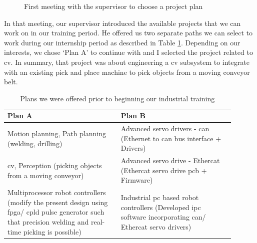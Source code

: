\documentclass[a4paper,12pt]{report}%
\begin{document}
\begin{figure}[h]
	\centering
	
	\caption{First meeting with the supervisor to choose a project plan}
	\label{fig:firstmeet}
\end{figure}

In that meeting, our supervisor introduced the available projects that we can work on in our training period. He offered us two separate paths we can select to work during our internship period as described in Table \ref{table:familiarize}. Depending on our interests, we chose  `Plan A' to continue with and I selected the project related to \ac{cv}. In summary, that project was about engineering a \ac{cv} subsystem to integrate with an existing pick and place machine to pick objects from a moving conveyor belt.



\begin{table}[h]
	\captionsetup{font=sc, labelsep=newline}
	\centering
	\caption{Plans we were offered prior to beginning our industrial training}
	\begin{tabular}{|p{0.45\linewidth}  |p{0.45\linewidth}  |}
		\hline
		\textbf{Plan A} & \textbf{Plan B}\\\hline
		Motion planning, Path planning (welding, drilling) & 
		Advanced servo drivers - \Ac{can} (Ethernet to \ac{can} bus interface + Drivers)\\ \hline
		
		\ac{cv}, Perception (picking objects from a moving conveyor) &
		Advanced servo drive - Ethercat (Ethercat servo drive \ac{pcb} + Firmware)\\ \hline
		
		Multiprocessor robot controllers (modify the present design using \ac{fpga}/ \ac{cpld} pulse generator such that precision welding and real-time picking is possible)& 
		Industrial \ac{pc} based robot controllers (Developed \ac{ipc} software incorporating \ac{can}/ Ethercat servo drivers)\\
		\hline
	\end{tabular}
	\label{table:familiarize}
\end{table}
\end{document}
